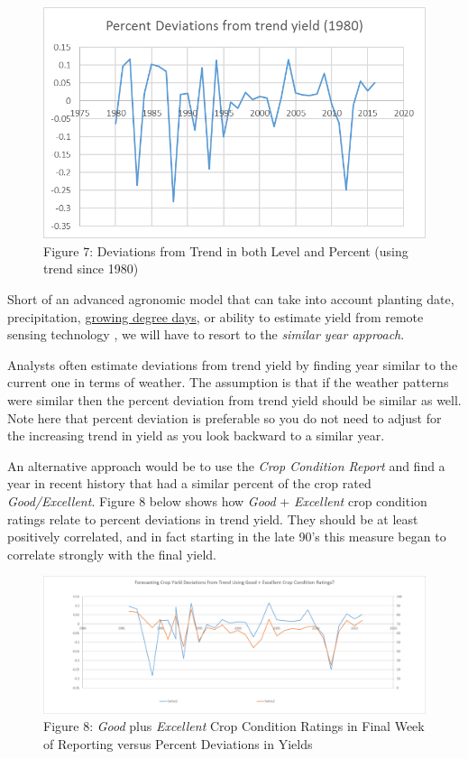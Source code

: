 \documentclass[]{book}
\theoremstyle{definition}
\theoremstyle{definition}
\theoremstyle{remark}
\begin{document}
\begin{figure}[htbp]
\centering
\includegraphics{Excel-files/ForecastingProduction-HistoricalAcreage_files/image017.png}
\caption{Figure 7: Deviations from Trend in both Level and Percent
(using trend since 1980)}
\end{figure}

Short of an advanced agronomic model that can take into account planting
date, precipitation,
\href{https://en.wikipedia.org/wiki/Growing_degree-day}{growing degree
days}, or ability to estimate yield from remote sensing technology
\citep{unganai1998drought}, we will have to resort to the \emph{similar
year approach}.

Analysts often estimate deviations from trend yield by finding year
similar to the current one in terms of weather. The assumption is that
if the weather patterns were similar then the percent deviation from
trend yield should be similar as well. Note here that percent deviation
is preferable so you do not need to adjust for the increasing trend in
yield as you look backward to a similar year.

An alternative approach would be to use the \emph{Crop Condition Report}
and find a year in recent history that had a similar percent of the crop
rated \emph{Good/Excellent}. Figure 8 below shows how \emph{Good} +
\emph{Excellent} crop condition ratings relate to percent deviations in
trend yield. They should be at least positively correlated, and in fact
starting in the late 90's this measure began to correlate strongly with
the final yield.

\begin{figure}[htbp]
\centering
\includegraphics{Excel-files/ForecastingProduction-HistoricalAcreage_files/image021.png}
\caption{Figure 8: \emph{Good} plus \emph{Excellent} Crop Condition
Ratings in Final Week of Reporting versus Percent Deviations in Yields}
\end{figure}
\end{document}

